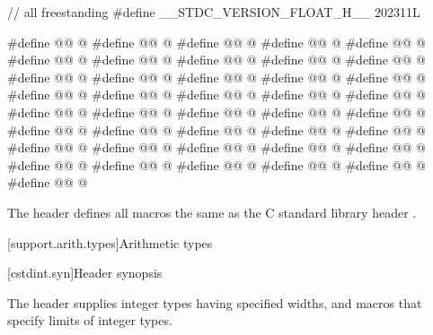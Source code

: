 %
\begin{codeblock}
// all freestanding
#define __STDC_VERSION_FLOAT_H__ 202311L

#define @@ @\seebelow@
#define @@ @\seebelow@
#define @@ @\seebelow@
#define @@ @\seebelow@
#define @@ @\seebelow@
#define @@ @\seebelow@
#define @@ @\seebelow@
#define @@ @\seebelow@
#define @@ @\seebelow@
#define @@ @\seebelow@
#define @@ @\seebelow@
#define @@ @\seebelow@
#define @@ @\seebelow@
#define @@ @\seebelow@
#define @@ @\seebelow@
#define @@ @\seebelow@
#define @@ @\seebelow@
#define @@ @\seebelow@
#define @@ @\seebelow@
#define @@ @\seebelow@
#define @@ @\seebelow@
#define @@ @\seebelow@
#define @@ @\seebelow@
#define @@ @\seebelow@
#define @@ @\seebelow@
#define @@ @\seebelow@
#define @@ @\seebelow@
#define @@ @\seebelow@
#define @@ @\seebelow@
#define @@ @\seebelow@
#define @@ @\seebelow@
#define @@ @\seebelow@
#define @@ @\seebelow@
#define @@ @\seebelow@
#define @@ @\seebelow@
#define @@ @\seebelow@
#define @@ @\seebelow@
#define @@ @\seebelow@
#define @@ @\seebelow@
#define @@ @\seebelow@
#define @@ @\seebelow@
\end{codeblock}

\pnum
The header  defines all macros the same as
the C standard library header .


[support.arith.types]{Arithmetic types}

[cstdint.syn]{Header  synopsis}

\pnum
The header 
supplies integer types having specified widths, and
macros that specify limits of integer types.

